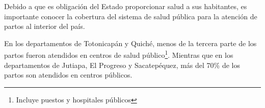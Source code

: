 Debido a que es obligación del Estado proporcionar salud a sus habitantes,  es importante conocer la cobertura del sistema de salud pública para la atención de partos al interior del país.  

En los departamentos de Totonicapán y Quiché, menos de la tercera parte de los partos fueron atendidos en centros de salud público\footnote{Incluye puestos y hospitales públicos}. Mientras que en los departamentos de Jutiapa, El Progreso y Sacatepéquez, más del 70\% de los partos son atendidos en centros públicos.  